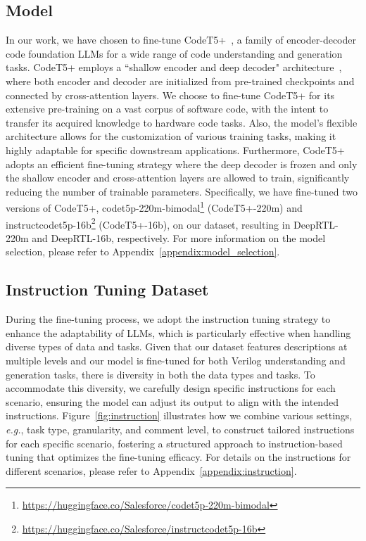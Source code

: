 \subsection{Model}
In our work, we have chosen to fine-tune CodeT5+~\citep{wang2023codet5+}, a family of encoder-decoder code foundation LLMs for a wide range of code understanding and generation tasks. CodeT5+ employs a ``shallow encoder and deep decoder" architecture~\citep{li2022competition}, where both encoder and decoder are initialized from pre-trained checkpoints and connected by cross-attention layers. 
We choose to fine-tune CodeT5+ for its extensive pre-training on a vast corpus of software code, 
with the intent to transfer its acquired knowledge to hardware code tasks.
Also, the model's flexible architecture allows for the customization of various training tasks, making it highly adaptable for specific downstream applications. Furthermore, CodeT5+ adopts an efficient fine-tuning strategy where the deep decoder is frozen and only the shallow encoder and cross-attention layers are allowed to train, significantly reducing the number of trainable parameters.
Specifically, we have fine-tuned two versions of CodeT5+, codet5p-220m-bimodal\footnote{\url{https://huggingface.co/Salesforce/codet5p-220m-bimodal}} (CodeT5+-220m) and instructcodet5p-16b\footnote{\url{https://huggingface.co/Salesforce/instructcodet5p-16b}} (CodeT5+-16b), on our dataset, resulting in DeepRTL-220m and DeepRTL-16b, respectively. 
For more information on the model selection, please refer to Appendix~\ref{appendix:model_selection}.



\subsection{Instruction Tuning Dataset}
During the fine-tuning process, we adopt the instruction tuning strategy to enhance the adaptability of LLMs, which is particularly effective when handling diverse types of data and tasks.
Given that our dataset features descriptions at multiple levels and our model is fine-tuned for both Verilog understanding and generation tasks, there is diversity in both the data types and tasks.
To accommodate this diversity, we carefully design specific instructions for each scenario, ensuring the model can adjust its output to align with the intended instructions. Figure~\ref{fig:instruction} illustrates how we combine various settings, \textit{e.g.}, task type, granularity, and comment level, to construct tailored instructions for each specific scenario, fostering a structured approach to instruction-based tuning that optimizes the fine-tuning efficacy. For details on the instructions for different scenarios, please refer to Appendix~\ref{appendix:instruction}.

